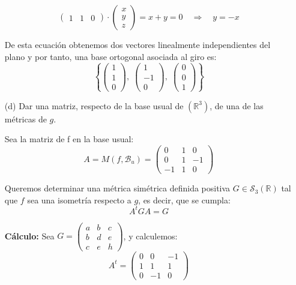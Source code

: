 \documentclass[12pt]{article}
\begin{document}
\begin{ejercicio}[4 puntos]
\begin{enumerate}
			\[
			\begin{pmatrix}
				1 & 1 & 0
			\end{pmatrix}
			\cdot
			\begin{pmatrix}
				x \\ y \\ z
			\end{pmatrix}
			= x + y = 0
			\quad \Rightarrow \quad y = -x
			\]
			
			De esta ecuación obtenemos dos vectores linealmente independientes del plano y por tanto, una base ortogonal asociada al giro es:
			\[
			\left\lbrace
			\begin{pmatrix} 1 \\ 1 \\ 0 \end{pmatrix},\;
			\begin{pmatrix} 1 \\ -1 \\ 0 \end{pmatrix},\;
			\begin{pmatrix} 0 \\ 0 \\ 1 \end{pmatrix}
			\right\rbrace
			\]
			
			\item[(d)] Dar una matriz, respecto de la base usual de $(\mathbb{R}^3)$, de una de las métricas de $g$.
			
			Sea la matriz de f en la base usual:
			\[
			A = M(f, \mathcal{B}_u) = \begin{pmatrix}
				0 & 1 & 0 \\
				0 & 1 & -1 \\
				-1 & 1 & 0
			\end{pmatrix}
			\]
			
			Queremos determinar una métrica simétrica definida positiva \( G \in \mathcal{S}_3(\mathbb{R}) \) tal que \( f \) sea una isometría respecto a \( g \), es decir, que se cumpla:
			\[
			A^t G A = G
			\]
			
			\textbf{Cálculo:} Sea \( G = \begin{pmatrix} a & b & c \\ b & d & e \\ c & e & h \end{pmatrix} \), y calculemos:
			\[
			A^t = \begin{pmatrix}
				0 & 0 & -1 \\
				1 & 1 & 1 \\
				0 & -1 & 0
			\end{pmatrix}
			\]
			

\end{enumerate}
\end{ejercicio}
\end{document}
